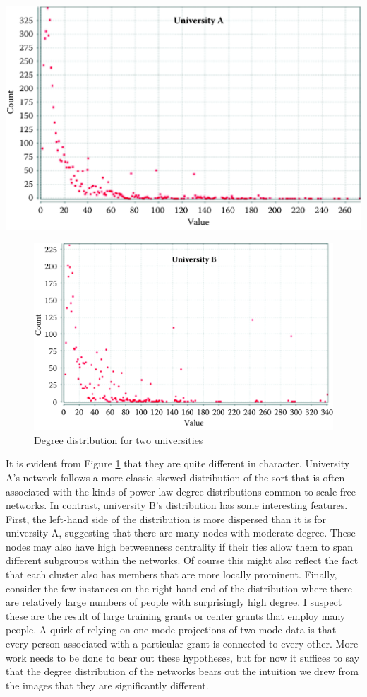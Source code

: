 \documentclass[]{krantz}
\begin{document}
\begin{center}\includegraphics[width=0.7\linewidth]{ChapterNetworks/figures/fig8-7a} \end{center}\begin{figure}

{\centering \includegraphics[width=0.7\linewidth]{ChapterNetworks/figures/fig8-7b} 

}

\caption{Degree distribution for two universities}\label{fig:fig8-7a}
\end{figure}

It is evident from Figure \ref{fig:fig8-7a} that they are quite
different in character. University A's network follows a more classic
skewed distribution of the sort that is often associated with the kinds
of power-law degree distributions common to scale-free networks. In
contrast, university B's distribution has some interesting features.
First, the left-hand side of the distribution is more dispersed than it
is for university A, suggesting that there are many nodes with moderate
degree. These nodes may also have high betweenness centrality if their
ties allow them to span different subgroups within the networks. Of
course this might also reflect the fact that each cluster also has
members that are more locally prominent. Finally, consider the few
instances on the right-hand end of the distribution where there are
relatively large numbers of people with surprisingly high degree. I
suspect these are the result of large training grants or center grants
that employ many people. A quirk of relying on one-mode projections of
two-mode data is that every person associated with a particular grant is
connected to every other. More work needs to be done to bear out these
hypotheses, but for now it suffices to say that the degree distribution
of the networks bears out the intuition we drew from the images that
they are significantly different.
\end{document}
